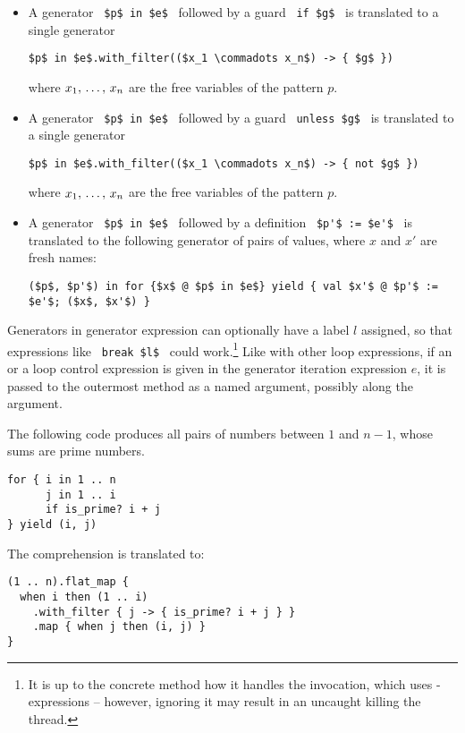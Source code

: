 \begin{itemize}
\item A generator ~\lstinline!$p$ in $e$!~ followed by a guard ~\lstinline!if $g$!~ is translated to a single generator
\begin{lstlisting}
$p$ in $e$.with_filter(($x_1 \commadots x_n$) -> { $g$ })
\end{lstlisting}
where $x_1 ,\, \ldots ,\, x_n$ are the free variables of the pattern $p$. 

\item A generator ~\lstinline!$p$ in $e$!~ followed by a guard ~\lstinline!unless $g$!~ is translated to a single generator
\begin{lstlisting}
$p$ in $e$.with_filter(($x_1 \commadots x_n$) -> { not $g$ })
\end{lstlisting}
where $x_1 ,\, \ldots ,\, x_n$ are the free variables of the pattern $p$. 

\item A generator ~\lstinline!$p$ in $e$!~ followed by a definition ~\lstinline!$p'$ := $e'$!~ is translated to the following generator of pairs of values, where $x$ and $x'$ are fresh names:
\begin{lstlisting}
($p$, $p'$) in for {$x$ @ $p$ in $e$} yield { val $x'$ @ $p'$ := $e'$; ($x$, $x'$) }
\end{lstlisting}

\end{itemize}

Generators in generator expression can optionally have a label $l$ assigned, so that expressions like ~\lstinline!break $l$!~ could work.\footnote{It is up to the concrete method how it handles the invocation, which uses - expressions -- however, ignoring it may result in an uncaught  killing the thread.} Like with other loop expressions, if an  or a  loop control expression is given in the generator iteration expression $e$, it is passed to the outermost  method as a named argument, possibly along the  argument. 

\example The following code produces all pairs of numbers between $1$ and $n - 1$, whose sums are prime numbers. 
\begin{lstlisting}
for { i in 1 .. n
      j in 1 .. i
      if is_prime? i + j
} yield (i, j)
\end{lstlisting}
The comprehension is translated to:
\begin{lstlisting}
(1 .. n).flat_map {
  when i then (1 .. i)
    .with_filter { j -> { is_prime? i + j } }
    .map { when j then (i, j) }
}
\end{lstlisting}

